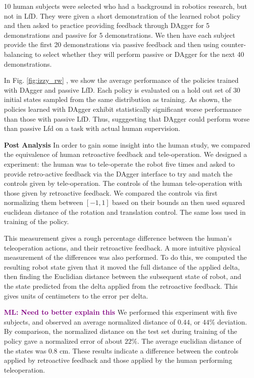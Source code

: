 \documentclass[10pt, conference]{ieeeconf}      %
\newcommand{\mlnote}[1]{\ifthenelse{ \boolean{include-notes}}%
 {\textcolor{purple}{\textbf{ML: #1}}}{}}
\begin{document}
10 human subjects were selected who had a background in robotics research, but not in LfD. They were given a short demonstration of the learned robot policy and then asked to practice providing feedback through DAgger for 5 demonstrations and passive for 5 demonstrations. We then have each subject provide the first 20 demonstrations via passive feedback and then using counter-balancing to select whether they will perform passive or DAgger for the next 40 demonstrations.  

In Fig. \ref{fig:izzy_rw} , we show the average performance of the policies trained with DAgger and passive LfD. Each policy is evaluated on a hold out set of 30 initial states sampled from the same distribution as training. As shown, the policies learned with DAgger exhibit statistically significant worse performance than those with passive LfD. Thus, sugggesting that DAgger could perform worse than passive Lfd on a task with actual human supervision. 

\noindent \textbf{Post Analysis}
In order to gain some insight into the human study, we compared the equivalence of human retroactive feedback and tele-operation. We designed a  experiment: the human was to tele-operate the robot five times and asked to provide retro-active feedback via the DAgger interface to try and match the controls given by tele-operation.    
The controls of the human tele-operation with those given by retroactive feedback. We compared the controls via first normalizing them between $[-1,1]$ based on their bounds an then used squared euclidean distance of the rotation and translation control. The same loss used in training of the policy. 

This measurement gives a rough percentage difference between the human's teleoperation actions, and their retroactive feedback. A more intuitive physical measurement of the differences was also performed. To do this, we computed the resulting robot state given that it moved the full distance of the applied delta, then finding the Euclidian distance between the subsequent state of robot, and the state predicted from the delta applied from the retroactive feedback. This gives units of centimeters to the error per delta.

\mlnote{Need to better explain this} We performed this experiment with five subjects, and observed an average normalized distance of $0.44$, or $44\%$ deviation. By comparison, the normalized distance on the test set during training of the policy gave a normalized error of about $22\%$. The average euclidian distance of the states was $0.8$ cm. These results indicate a  difference between the controls applied by retroactive feedback and those applied by the human performing teleoperation.
\end{document}
